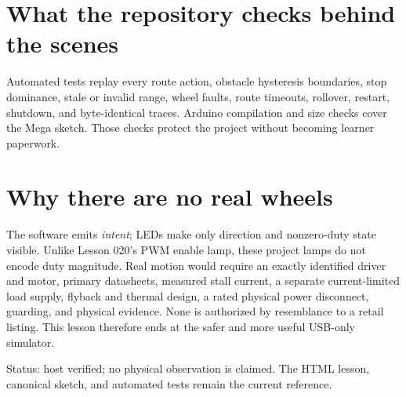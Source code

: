 \documentclass[11pt]{article}
\begin{document}
\section{What the repository checks behind the scenes}

Automated tests replay every route action, obstacle hysteresis boundaries,
stop dominance, stale or invalid range, wheel faults, route timeouts,
rollover, restart, shutdown, and byte-identical traces. Arduino compilation
and size checks cover the Mega sketch. Those checks protect the project
without becoming learner paperwork.

\section{Why there are no real wheels}

The software emits \emph{intent}; LEDs make only direction and nonzero-duty
state visible. Unlike Lesson 020's PWM enable lamp, these project lamps do not
encode duty magnitude. Real motion
would require an exactly identified driver and motor, primary datasheets,
measured stall current, a separate current-limited load supply, flyback and
thermal design, a rated physical power disconnect, guarding, and physical
evidence. None is authorized by resemblance to a retail listing. This lesson
therefore ends at the safer and more useful USB-only simulator.

\vfill
\small
Status: host verified; no physical observation is claimed. The HTML lesson,
canonical sketch, and automated tests remain the current reference.
\end{document}
